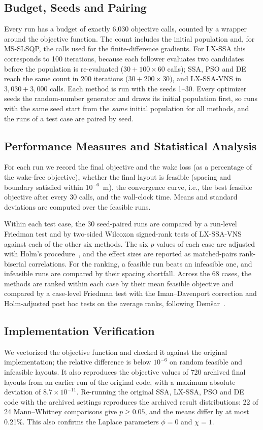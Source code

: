 \documentclass[journal,twoside]{IEEEtran}
\begin{document}
\subsection{Budget, Seeds and Pairing}
Every run has a budget of exactly 6,030 objective calls, counted by a wrapper around the objective function. The count includes the initial population and, for MS-SLSQP, the calls used for the finite-difference gradients. For LX-SSA this corresponds to 100 iterations, because each follower evaluates two candidates before the population is re-evaluated ($30+100\times60$ calls); SSA, PSO and DE reach the same count in 200 iterations ($30+200\times30$), and LX-SSA-VNS in $3{,}030+3{,}000$ calls. Each method is run with the seeds 1--30. Every optimizer seeds the random-number generator and draws its initial population first, so runs with the same seed start from the \emph{same} initial population for all methods, and the runs of a test case are paired by seed.

\subsection{Performance Measures and Statistical Analysis}
For each run we record the final objective and the wake loss (as a percentage of the wake-free objective), whether the final layout is feasible (spacing and boundary satisfied within $10^{-6}$~m), the convergence curve, i.e., the best feasible objective after every 30 calls, and the wall-clock time. Means and standard deviations are computed over the feasible runs.

Within each test case, the 30 seed-paired runs are compared by a run-level Friedman test and by two-sided Wilcoxon signed-rank tests of LX-SSA-VNS against each of the other six methods. The six $p$ values of each case are adjusted with Holm's procedure~\cite{Holm1979}, and the effect sizes are reported as matched-pairs rank-biserial correlations. For the ranking, a feasible run beats an infeasible one, and infeasible runs are compared by their spacing shortfall. Across the 68 cases, the methods are ranked within each case by their mean feasible objective and compared by a case-level Friedman test with the Iman--Davenport correction and Holm-adjusted post hoc tests on the average ranks, following Dem\v{s}ar~\cite{Demsar2006}.

\subsection{Implementation Verification}
\label{sec:validation}
We vectorized the objective function and checked it against the original implementation; the relative difference is below $10^{-6}$ on random feasible and infeasible layouts. It also reproduces the objective values of 720 archived final layouts from an earlier run of the original code, with a maximum absolute deviation of $8.7\times10^{-11}$. Re-running the original SSA, LX-SSA, PSO and DE code with the archived settings reproduces the archived result distributions: 22 of 24 Mann--Whitney comparisons give $p\ge0.05$, and the means differ by at most 0.21\%. This also confirms the Laplace parameters $\phi=0$ and $\chi=1$.
\end{document}

